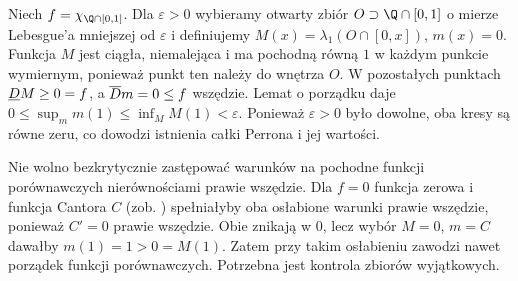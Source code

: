 \begin{przyklad}
Niech $f=\ind{\Q\cap[0,1]}$. Dla $\varepsilon>0$ wybieramy otwarty zbiór $O\supset\Q\cap[0,1]$ o mierze Lebesgue'a mniejszej od $\varepsilon$ i definiujemy $M(x)=\lambda_1(O\cap[0,x])$, $m(x)=0$. Funkcja $M$ jest ciągła, niemalejąca i ma pochodną równą $1$ w każdym punkcie wymiernym, ponieważ punkt ten należy do wnętrza $O$. W pozostałych punktach $\underline D M\ge0=f$, a $\overline D m=0\le f$ wszędzie. Lemat o porządku daje $0\le\sup_m m(1)\le\inf_M M(1)<\varepsilon$. Ponieważ $\varepsilon>0$ było dowolne, oba kresy są równe zeru, co dowodzi istnienia całki Perrona i jej wartości.
\end{przyklad}
\begin{uwaga}
Nie wolno bezkrytycznie zastępować warunków na pochodne funkcji porównawczych nierównościami prawie wszędzie. Dla $f=0$ funkcja zerowa i funkcja Cantora $C$
(zob. )
spełniałyby oba osłabione warunki prawie wszędzie,
ponieważ $C'=0$ prawie wszędzie. Obie znikają w $0$,
lecz wybór $M=0$, $m=C$ dawałby $m(1)=1>0=M(1)$.
Zatem przy takim osłabieniu zawodzi nawet porządek
funkcji porównawczych. Potrzebna jest kontrola zbiorów wyjątkowych.
\end{uwaga}

